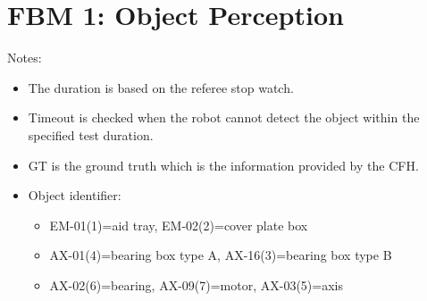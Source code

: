 \section*{FBM 1: Object Perception}


\noindent Notes:
\begin{itemize}
\item The duration is based on the referee stop watch.
\item Timeout is checked when the robot cannot detect the object within the specified test duration.
\item GT is the ground truth which is the information provided by the CFH.
\item Object identifier:
	\begin{itemize}
		\item EM-01(1)=aid tray, EM-02(2)=cover plate box
		\item AX-01(4)=bearing box type A, AX-16(3)=bearing box type B
		\item AX-02(6)=bearing, AX-09(7)=motor, AX-03(5)=axis
	\end{itemize}
\end{itemize}

\vspace{0.5cm}

\\

\newpage
{}\\
\\
\\

\newpage
{}\\
\\
\\

\newpage
{}\\
\\


